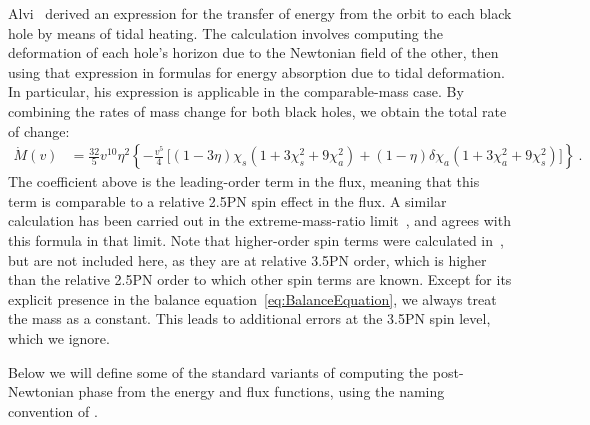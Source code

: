 Alvi~\cite{Alvi:2001} derived an expression for the transfer of energy
from the orbit to each black hole by means of tidal heating.  The
calculation involves computing the deformation of each hole's horizon
due to the Newtonian field of the other, then using that expression in
formulas for energy absorption due to tidal deformation.  In
particular, his expression is applicable in the comparable-mass case.
By combining the rates of mass change for both black holes, we obtain
the total rate of change:
\begin{equation}
  \label{eq:MassRateOfChange}
  \begin{split}
    \dot{M}(v) &= \frac{32}{5} v^{10} \eta^{2} \left\{
      -\frac{v^{5}}{4}\, \Big[ (1 - 3\eta) \chi_{s} (1 + 3\chi_{s}^{2}
      + 9\chi_{a}^{2}) + (1 - \eta) \delta \chi_{a} (1 + 3\chi_{a}^{2}
      + 9\chi_{s}^{2}) \Big] \right\}~.
  \end{split}
\end{equation}
The coefficient above is the leading-order term in the flux, meaning
that this term is comparable to a relative 2.5PN spin effect in the
flux.  A similar calculation has been carried out in the
extreme-mass-ratio limit~\cite{Tagoshi:1997}, and agrees with this
formula in that limit.  Note that higher-order spin terms were
calculated in~\cite{Alvi:2001}, but are not included here, as they are
at relative 3.5PN order, which is higher than the relative 2.5PN order
to which other spin terms are known.  Except for its explicit presence
in the balance equation~\eqref{eq:BalanceEquation}, we always treat
the mass as a constant.  This leads to additional errors at the 3.5PN
spin level, which we ignore.


Below we will define some of the standard variants of computing
the post-Newtonian phase from the energy and flux functions,
using the naming convention of \cite{Damour:2000zb}.

